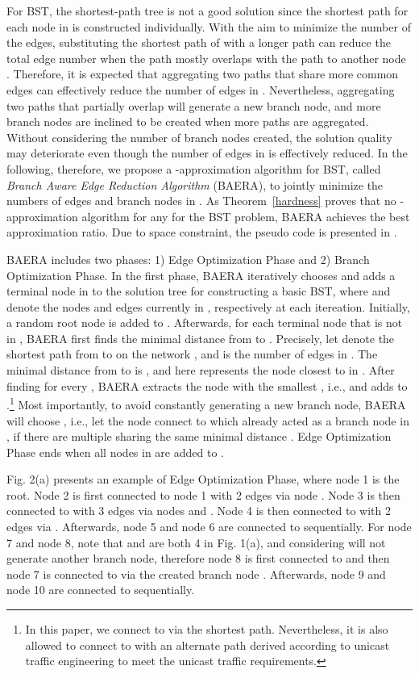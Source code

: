 \documentclass[conference]{IEEEtran}
\begin{document}
For BST, the shortest-path tree is not a good solution since the shortest
path for each node  in  is constructed individually. With the aim to
minimize the number of the edges, substituting the shortest path of  with a
longer path can reduce the total edge number when the path mostly overlaps
with the path to another node  \cite{Takahashi1980}. Therefore, it is expected
that aggregating two paths that share more common edges can effectively
reduce the number of edges in . Nevertheless, aggregating two paths that
partially overlap will generate a new branch node, and more branch nodes are
inclined to be created when more paths are aggregated. Without considering
the number of branch nodes created, the solution quality may deteriorate
even though the number of edges in  is effectively reduced. In the
following, therefore, we propose a -approximation algorithm for BST,
called \textit{Branch Aware Edge Reduction Algorithm} (BAERA), to jointly
minimize the numbers of edges and branch nodes in . As Theorem~\ref {hardness} proves that no -approximation algorithm for
any  for the BST problem, BAERA achieves the best approximation
ratio. Due to space constraint, the pseudo code is presented in \cite{DBLP}.


BAERA includes two phases: 1) Edge Optimization Phase and 2) Branch
Optimization Phase. In the first phase, BAERA iteratively chooses and adds a
terminal node in  to the solution tree  for constructing
a basic BST, where  and  denote the nodes and edges currently
in , respectively at each itereation. Initially, a random root node is added to .
Afterwards, for each terminal node  that is not in , BAERA
first finds the minimal distance  from  to . Precisely, let  denote the shortest path from  to  on the network , and  is the number of edges in . The
minimal distance  from  to  is , and  here represents the node closest to  in . After finding  for every , BAERA extracts the node 
with the smallest , i.e.,  and adds  to .\footnote{In this paper, we connect  to  via the shortest path.
Nevertheless, it is also allowed to connect  to  with an
alternate path derived according to unicast traffic engineering \cite {Agarwal2013} to meet the unicast traffic requirements.} Most importantly,
to avoid constantly generating a new branch node, BAERA will choose ,
i.e., let the node  connect to  which already acted as a branch node in , if there are multiple  sharing the same minimal distance . Edge Optimization Phase ends when all nodes in  are
added to .

Fig. 2(a) presents an example of Edge Optimization Phase, where node 1 is
the root. Node 2 is first connected to node 1 with 2 edges via node . Node 3 is then connected to  with 3 edges via nodes  and . Node 4 is then connected to  with 2 edges via . Afterwards,
node 5 and node 6 are connected to  sequentially. For node 7
and node 8, note that  and  are both 4 in Fig. 1(a), and considering  will not generate another branch node, therefore node 8
is first connected to  and then node 7 is connected to  via the created branch node .
Afterwards, node 9 and node 10 are connected to  sequentially.
\end{document}
